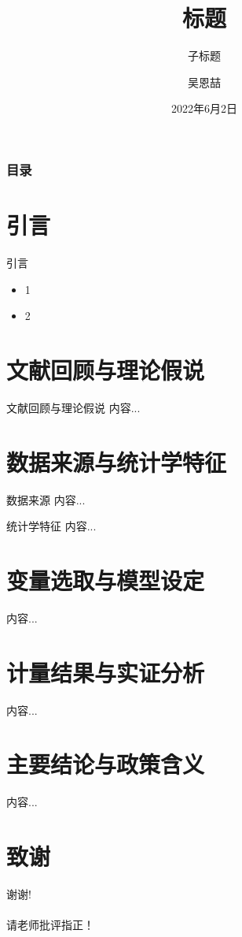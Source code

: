 \documentclass{beamer}
\author[Enzhe Wu]{吴恩喆}
\title[Huazhong Agricultural University]{标题}
\subtitle{子标题}
\institute[enzhewu@outlook.com]{华中农业大学
	
	经济管理学院}
\date[2022.06.02]{2022年6月2日}
\begin{document}
	\kaishu
	
	\frame{\titlepage}
	
	\begin{frame}
		\frametitle{目录}
		\tableofcontents
	\end{frame}
	
	\section{引言}
	\begin{frame}{引言}
		\begin{itemize}
			\item 1
			\item 2
		\end{itemize}
	\end{frame}

	\section{文献回顾与理论假说}
	\begin{frame}{文献回顾与理论假说}
		内容...
	\end{frame}
	
	\section{数据来源与统计学特征}
	\begin{frame}{数据来源}
		内容...
	\end{frame}
	\begin{frame}{统计学特征}
		内容...
	\end{frame}

	\section{变量选取与模型设定}
	\begin{frame}{}
		内容...
	\end{frame}

	\section{计量结果与实证分析}
	\begin{frame}{}
		内容...
	\end{frame}

	\section{主要结论与政策含义}
	\begin{frame}{}
		内容...
	\end{frame}
	
	\section*{致谢}  
	\begin{frame}
		\begin{center}
			\textcolor{myNewColorA}{\huge {谢谢!\\ \quad \\ 请老师批评指正！}}
		\end{center}
	\end{frame}
	
\end{document}
